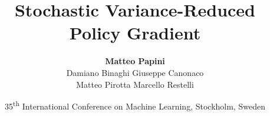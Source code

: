 \documentclass[aspectratio=169]{beamer}
\title{Stochastic Variance-Reduced Policy Gradient}
\date[ICML 2018]{\small{35\textsuperscript{th} International Conference on Machine Learning, Stockholm, Sweden}}
\author[Papini et al.]{\textbf{Matteo Papini} \\
						\small{Damiano Binaghi \quad Giuseppe Canonaco \\
								Matteo Pirotta \quad Marcello Restelli}}
\newcommand{\enb}[1]{\textcolor{poliblue1}{\textbf{#1}}}
\newcommand{\soft}[1]{\textcolor{softblue}{#1}}
\begin{document}

\begin{frame}
\titlepage
\end{frame}

%
%
%
\end{document}
